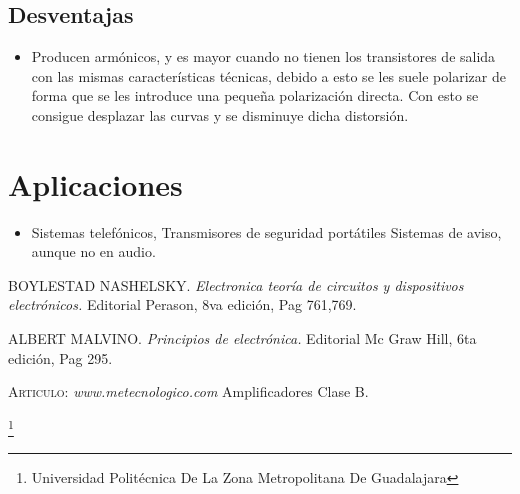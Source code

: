 \documentclass[11pt,a4paper]{article}
\begin{document}
\subsection{Desventajas}

\begin{itemize}


\item Producen armónicos, y es mayor cuando no tienen los transistores de salida con las mismas características técnicas, debido a esto se les suele polarizar de forma que se les introduce una pequeña polarización directa. Con esto se consigue desplazar las curvas y se disminuye dicha distorsión.

\end{itemize}

\section{Aplicaciones}

\begin{itemize}
\item     Sistemas telefónicos,
    Transmisores de seguridad portátiles
    Sistemas de aviso, aunque no en audio.
\end{itemize}


\begin{thebibliography}{X}
 \textsc{BOYLESTAD NASHELSKY.} \textit{Electronica teoría de circuitos y dispositivos electrónicos.} Editorial Perason, 8va edición, Pag 761,769.

 \textsc{ALBERT MALVINO.} \textit{Principios de electrónica.} 
Editorial Mc Graw Hill, 6ta edición, Pag 295.


 \textsc{Articulo:} \textit{www.metecnologico.com} 
Amplificadores Clase B.

\end{thebibliography}



\footnote{Universidad Politécnica De La Zona Metropolitana De Guadalajara} 
\newpage
\end{document}
